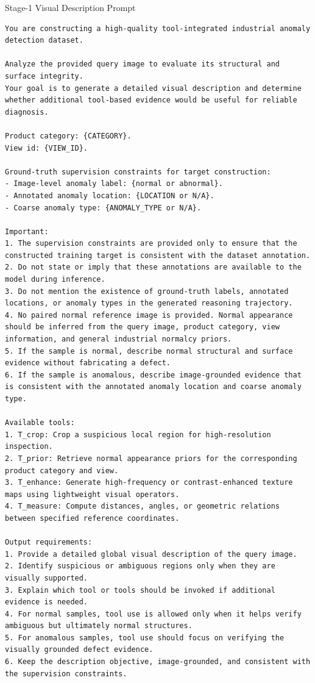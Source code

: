 \documentclass{llmxive}
\begin{document}
{\begin{promptbox}{Stage-1 Visual Description Prompt}
\begin{lstlisting}[style=promptstyle]
You are constructing a high-quality tool-integrated industrial anomaly detection dataset.

Analyze the provided query image to evaluate its structural and surface integrity. 
Your goal is to generate a detailed visual description and determine whether additional tool-based evidence would be useful for reliable diagnosis.

Product category: {CATEGORY}.
View id: {VIEW_ID}.

Ground-truth supervision constraints for target construction:
- Image-level anomaly label: {normal or abnormal}.
- Annotated anomaly location: {LOCATION or N/A}.
- Coarse anomaly type: {ANOMALY_TYPE or N/A}.

Important:
1. The supervision constraints are provided only to ensure that the constructed training target is consistent with the dataset annotation.
2. Do not state or imply that these annotations are available to the model during inference.
3. Do not mention the existence of ground-truth labels, annotated locations, or anomaly types in the generated reasoning trajectory.
4. No paired normal reference image is provided. Normal appearance should be inferred from the query image, product category, view information, and general industrial normalcy priors.
5. If the sample is normal, describe normal structural and surface evidence without fabricating a defect.
6. If the sample is anomalous, describe image-grounded evidence that is consistent with the annotated anomaly location and coarse anomaly type.

Available tools:
1. T_crop: Crop a suspicious local region for high-resolution inspection.
2. T_prior: Retrieve normal appearance priors for the corresponding product category and view.
3. T_enhance: Generate high-frequency or contrast-enhanced texture maps using lightweight visual operators.
4. T_measure: Compute distances, angles, or geometric relations between specified reference coordinates.

Output requirements:
1. Provide a detailed global visual description of the query image.
2. Identify suspicious or ambiguous regions only when they are visually supported.
3. Explain which tool or tools should be invoked if additional evidence is needed.
4. For normal samples, tool use is allowed only when it helps verify ambiguous but ultimately normal structures.
5. For anomalous samples, tool use should focus on verifying the visually grounded defect evidence.
6. Keep the description objective, image-grounded, and consistent with the supervision constraints.
\end{lstlisting}
\end{promptbox}

}
\end{document}
